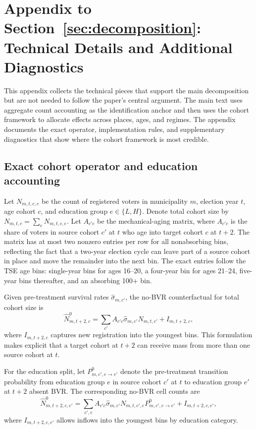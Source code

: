 
\section{Appendix to Section~\ref{sec:decomposition}: Technical Details and Additional Diagnostics}
\label{app:decomposition}

This appendix collects the technical pieces that support the main decomposition but are not needed to follow the paper's central argument. The main text uses aggregate count accounting as the identification anchor and then uses the cohort framework to allocate effects across places, ages, and regimes. The appendix documents the exact operator, implementation rules, and supplementary diagnostics that show where the cohort framework is most credible.

\subsection{Exact cohort operator and education accounting}
\label{app:decomp_operator}

Let $N_{m,t,c,e}$ be the count of registered voters in municipality $m$, election year $t$, age cohort $c$, and education group $e \in \{L,H\}$. Denote total cohort size by $N_{m,t,c} = \sum_{e} N_{m,t,c,e}$. Let $A_{c'c}$ be the mechanical-aging matrix, where $A_{c'c}$ is the share of voters in source cohort $c'$ at $t$ who age into target cohort $c$ at $t+2$. The matrix has at most two nonzero entries per row for all nonabsorbing bins, reflecting the fact that a two-year election cycle can leave part of a source cohort in place and move the remainder into the next bin. The exact entries follow the TSE age bins: single-year bins for ages 16--20, a four-year bin for ages 21--24, five-year bins thereafter, and an absorbing 100+ bin.

Given pre-treatment survival rates $\hat\sigma_{m,c'}$, the no-BVR counterfactual for total cohort size is
\begin{equation}
\widehat N^{0}_{m,t+2,c}
=
\sum_{c'} A_{c'c}\hat\sigma_{m,c'}N_{m,t,c'} + I_{m,t+2,c},
\label{eq:app_decomp_total_counterfactual}
\end{equation}
where $I_{m,t+2,c}$ captures new registration into the youngest bins. This formulation makes explicit that a target cohort at $t+2$ can receive mass from more than one source cohort at $t$.

For the education split, let $P^{0}_{m,c',e \rightarrow e'}$ denote the pre-treatment transition probability from education group $e$ in source cohort $c'$ at $t$ to education group $e'$ at $t+2$ absent BVR. The corresponding no-BVR cell counts are
\begin{equation}
\widehat N^{0}_{m,t+2,c,e'}
=
\sum_{c',e} A_{c'c}\hat\sigma_{m,c'}N_{m,t,c',e}P^{0}_{m,c',e \rightarrow e'} + I_{m,t+2,c,e'},
\label{eq:app_decomp_cell_counterfactual}
\end{equation}
where $I_{m,t+2,c,e'}$ allows inflows into the youngest bins by education category.

